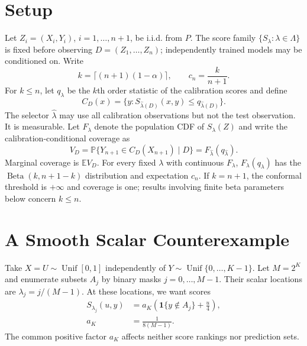 \documentclass{article}
\newcommand{\PP}{\mathbb P}
\newcommand{\EE}{\mathbb E}
\newcommand{\ind}{\mathbf 1}
\begin{document}
\section{Setup}

Let $Z_i=(X_i,Y_i)$, $i=1,\ldots,n+1$, be i.i.d. from $P$. The score family $\{S_\lambda:\lambda\in\Lambda\}$ is fixed before observing $D=(Z_1,\ldots,Z_n)$; independently trained models may be conditioned on. Write
\begin{equation}
 k=\lceil(n+1)(1-\alpha)\rceil,\qquad c_n=\frac{k}{n+1}.
\end{equation}
For $k\le n$, let $q_\lambda$ be the $k$th order statistic of the calibration scores and define
\begin{equation}
 C_D(x)=\{y:S_{\hat\lambda(D)}(x,y)\le q_{\hat\lambda(D)}\}.
\end{equation}
The selector $\hat\lambda$ may use all calibration observations but not the test observation. It is measurable. Let $F_\lambda$ denote the population CDF of $S_\lambda(Z)$ and write the calibration-conditional coverage as
\begin{equation}\label{eq:conditional}
 V_D=\PP\{Y_{n+1}\in C_D(X_{n+1})\mid D\}
     =F_{\hat\lambda}(q_{\hat\lambda}).
\end{equation}
Marginal coverage is $\EE V_D$. For every fixed $\lambda$ with continuous $F_\lambda$, $F_\lambda(q_\lambda)$ has the $\operatorname{Beta}(k,n+1-k)$ distribution and expectation $c_n$. If $k=n+1$, the conformal threshold is $+\infty$ and coverage is one; results involving finite beta parameters below concern $k\le n$.

\section{A Smooth Scalar Counterexample}

Take $X=U\sim\operatorname{Unif}[0,1]$ independently of $Y\sim\operatorname{Unif}\{0,\ldots,K-1\}$. Let $M=2^K$ and enumerate subsets $A_j$ by binary masks $j=0,\ldots,M-1$. Their scalar locations are $\lambda_j=j/(M-1)$. At these locations, we want scores
\begin{equation}\label{eq:knots}
 \begin{aligned}
 S_{\lambda_j}(u,y)&=a_K\left(\ind\{y\notin A_j\}+\frac{u}{4}\right),\\
 a_K&=\frac{1}{8(M-1)}.
 \end{aligned}
\end{equation}
The common positive factor $a_K$ affects neither score rankings nor prediction sets.
\end{document}
